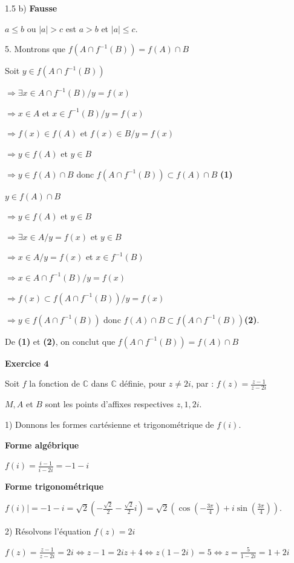 \documentclass[12pt]{article}
\begin{document}
\begin{spacing}{1.5}
b) \textbf{Fausse}

$a\leq b$ ou $\mid a\mid> c$ est $a>b$ et $\mid a\mid\leq c$.

5. Montrons que $f(A\cap f^{-1}(B))=f(A)\cap B$

Soit $y\in f(A\cap f^{-1}(B))$

$\Rightarrow \exists x\in A\cap f^{-1}(B)/y=f(x)$

$\Rightarrow x\in A$ et $x\in f^{-1}(B)/y=f(x)$

$\Rightarrow f(x)\in f(A)$ et $f(x)\in B/y=f(x)$

$\Rightarrow y\in f(A)$ et $y\in B$

$\Rightarrow y\in f(A)\cap B$ donc $f(A\cap f^{-1}(B))\subset f(A)\cap B$ \textbf{(1)}

\medskip $y\in f(A)\cap B$

$\Rightarrow y\in f(A)$ et $y\in B$

$\Rightarrow \exists x\in A/y=f(x)$ et $y\in B$

$\Rightarrow x\in A/y=f(x)$ et $x\in f^{-1}(B)$

$\Rightarrow x\in A\cap f^{-1}(B)/y=f(x)$

$\Rightarrow f(x) \subset f(A\cap f^{-1}(B))/y=f(x)$

$\Rightarrow y\in f(A\cap f^{-1}(B))$ donc $f(A)\cap B \subset f(A\cap f^{-1}(B))$\textbf{(2)}.

De \textbf{(1)} et \textbf{(2)}, on conclut que $f(A\cap f^{-1}(B))=f(A)\cap B$

\medskip\textbf{Exercice 4}

Soit $f$ la fonction de $\mathbb{C}$ dans $\mathbb{C}$ définie, pour $z\neq 2i$, par : 
$f(z) = \frac{z -1}{z -2i}$

$M, A $ et $ B$ sont les points d'affixes respectives $z, 1, 2i$. 

1) Donnons les formes cartésienne et trigonométrique de $f(i)$.

\textbf{Forme algébrique}

$f(i) = \frac{i -1}{i -2i}=-1-i$

\textbf{Forme trigonométrique}

$ f(i)\mid=-1-i=\sqrt{2}(-\frac{\sqrt{2}}{2}-\frac{\sqrt{2}}{2}i)=\sqrt{2}(\cos(-\frac{3\pi}{4})+i\sin(\frac{3\pi}{4}))$.

2) Résolvons l'équation $f(z) = 2i$

$f(z) = \frac{z -1}{z -2i}=2i\Leftrightarrow z-1=2iz+4\Leftrightarrow z(1-2i)=5\Leftrightarrow z=\frac{5}{1-2i}=1+2i$


\end{spacing}
\end{document}
